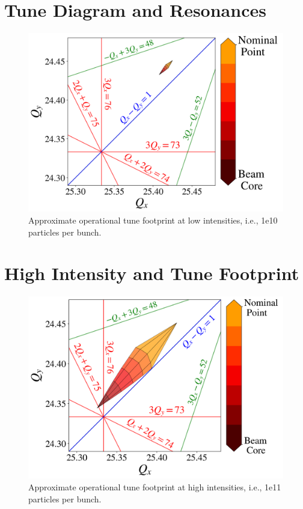 \section{Tune Diagram and Resonances}

\begin{figure}[H]
   \centering
   \includegraphics[width=\columnwidth]{chapter3/rrtdlow.png}
   \caption{Approximate operational tune footprint at low intensities, i.e., 1e10 particles per bunch.}
   \label{fig:rrtdlow}
\end{figure}

\section{High Intensity and Tune Footprint}

\begin{figure}[H]
   \centering
   \includegraphics[width=\columnwidth]{chapter3/rrtdhigh.png}
   \caption{Approximate operational tune footprint at high intensities, i.e., 1e11 particles per bunch.}
   \label{fig:rrtdhigh}
\end{figure}